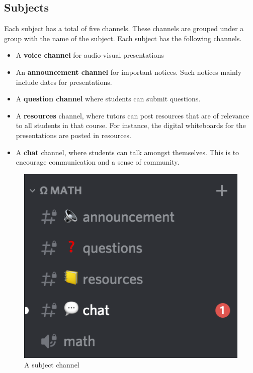 \documentclass{business}
\begin{document}
    \subsection{Subjects}\label{subject-channels}
    Each subject has a total of five channels. These channels are grouped under a group with the name of the subject. Each subject has the following channels.\par
    \begin{minipage}{0.5\textwidth}
        \begin{itemize}
            \item A \textbf{voice channel} for audio-visual presentations
            \item An \textbf{announcement channel} for important notices. Such notices mainly include dates for presentations.
            \item A \textbf{question channel} where students can submit questions.
            \item A \textbf{resources} channel, where tutors can post resources that are of relevance to all students in that course. For instance, the digital whiteboards for the presentations are posted in resources.
            \item A \textbf{chat} channel, where students can talk amongst themselves. This is to encourage communication and a sense of community.
        \end{itemize}
    \end{minipage}
    \begin{minipage}{0.5\textwidth}
        \centering
        \begin{figure}[H]
            \centering
            \caption{A subject channel}
            \includegraphics[scale=0.8]{./images/server-subject.png}
        \end{figure}
    \end{minipage}
\end{document}
